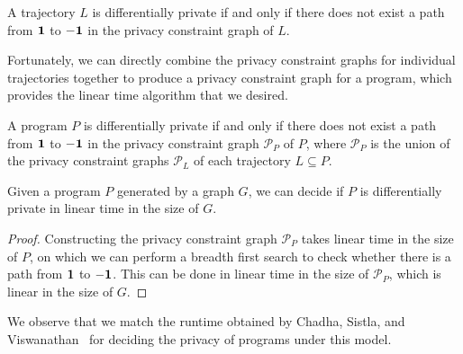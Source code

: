 \begin{prop}\label{privacyConstraintGraphProp}
    A trajectory $L$ is differentially private if and only if there does not exist a path from $\bf 1$ to $\bf -1$ in the privacy constraint graph of $L$.
\end{prop}

Fortunately, we can directly combine the privacy constraint graphs for individual trajectories together to produce a privacy constraint graph for a program, which provides the linear time algorithm that we desired.

\begin{prop}\label{programPrivacyConstraintGraphPathReq}
    A program $P$ is differentially private if and only if there does not exist a path from $\bf 1$ to $\bf -1$ in the privacy constraint graph $\mathcal{P}_P$ of $P$, where $\mathcal{P}_P$ is the union of the privacy constraint graphs $\mathcal{P}_L$ of each trajectory $L\subseteq P$.
\end{prop}

\begin{thm}\label{LinearTimeDecidingPrograms}
    Given a program $P$ generated by a graph $G$, we can decide if $P$ is differentially private in linear time in the size of $G$.
\end{thm}

\begin{proof}
    Constructing the privacy constraint graph $\mathcal{P}_P$ takes linear time in the size of $P$, on which we can perform a breadth first search to check whether there is a path from $\bf 1$ to $\bf -1$. This can be done in linear time in the size of $\mathcal{P}_P$, which is linear in the size of $G$.
\end{proof}

We observe that we match the runtime obtained by Chadha, Sistla, and Viswanathan~\cite{chadhaLinearTimeDecidability2021} for deciding the privacy of programs under this model. 


